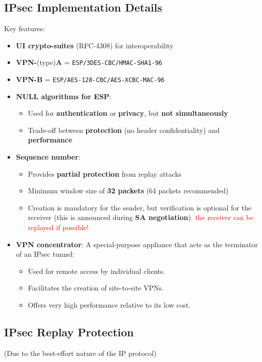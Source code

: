 \subsection*{IPsec Implementation Details}
Key features:
\begin{itemize}
    \item \textbf{UI crypto-suites} (RFC-4308) for interoperability
    \item \textbf{VPN-}(type)\textbf{A} = \texttt{ESP/3DES-CBC/HMAC-SHA1-96}
    \item \textbf{VPN-B} = \texttt{ESP/AES-128-CBC/AES-XCBC-MAC-96}
    \item \textbf{NULL algorithms for ESP}:
    \begin{itemize}
        \item Used for \textbf{authentication} or \textbf{privacy}, but \textbf{not simultaneously}
        \item Trade-off between \textbf{protection} (no header confidentiality) and \textbf{performance}
    \end{itemize}
    \item \textbf{Sequence number}:
    \begin{itemize}
        \item Provides \textbf{partial protection} from replay attacks
        \item Minimum window size of \textbf{32 packets} (64 packets recommended)
        \item Creation is mandatory for the sender, but verification is optional for the receiver (this is announced during \textbf{SA negotiation}). \textcolor{red}{the receiver can be replayed if possible!}
    \end{itemize}
    \item \textbf{VPN concentrator}: A special-purpose appliance that acts as the terminator of an IPsec tunnel:
    \begin{itemize}
        \item Used for remote access by individual clients.
        \item Facilitates the creation of site-to-site VPNs.
        \item Offers very high performance relative to its low cost.
    \end{itemize}
\end{itemize}



\subsection{IPsec Replay Protection}
\begin{center}
    (Due to the best-effort nature of the IP protocol)
\end{center}

